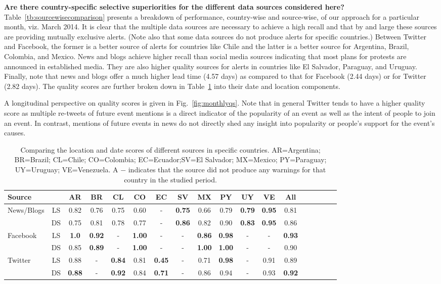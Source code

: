 \documentclass[letterpaper]{article}
\begin{document}
\noindent
{\bf Are there country-specific selective superiorities for the
different data sources considered here?}
Table~\ref{tb:sourcewisecomparison} presents a breakdown of performance,
country-wise and source-wise, of our approach for a particular month,
viz. March 2014.  It is clear that the multiple data sources are
necessary to achieve a high recall and that by and large these sources
are providing mutually exclusive alerts. (Note also that some data
sources do not produce alerts for specific countries.) Between Twitter
and Facebook, the former is a better source of alerts for countries like
Chile and the latter is a better source for Argentina, Brazil, Colombia,
and Mexico.  News and blogs achieve higher recall than social media
sources indicating that most plans for protests are announced in
established media. They are also higher quality sources for alerts in
countries like El Salvador, Paraguay, and Uruguay.  Finally, note that
news and blogs offer a much higher lead time (4.57 days) as compared to
that for Facebook (2.44 days) or for Twitter (2.82 days). The quality
scores are further broken down in Table~\ref{tb:modelwisecomparison}
into their date and location components.

A longitudinal perspective on quality scores is given in
Fig.~\ref{fig:monthlyqs}. Note that in general Twitter tends to have a
higher quality score as multiple re-tweets of future event mentions is a
direct indicator of the popularity of an event as well as the intent of
people to join an event.  In contrast, mentions of future events in news
do not directly shed any insight into popularity or people's support for
the event's causes.\\

\begin{table} %
  \small
\centering
\caption{\small Comparing the location and date scores of different sources in specific countries.
AR=Argentina; BR=Brazil; CL=Chile; CO=Colombia; EC=Ecuador;SV=El
Salvador; MX=Mexico; PY=Paraguay; UY=Uruguay; VE=Venezuela. A $-$
indicates that the source did not produce any warnings for that country
in the studied period.} \label{tb:modelwisecomparison}
\begin{tabular}{|l|*{17}{c|}}
\hline
Source& & AR & BR & CL & CO & EC & SV & MX & PY & UY & VE & All\\
\hline
\multirow{2}{*}{News/Blogs} &LS &0.82&0.76&0.75&0.60&-&{\bf0.75}&0.66&0.79&{\bf0.79}&{\bf0.95}&0.81\\
                            &DS&0.75&0.81&0.78&0.77&-&{\bf0.86}&0.82&0.90&{\bf0.83}&{\bf0.95}&0.86\\
\hline
\multirow{2}{*}{Facebook} &LS &{\bf1.0}&{\bf0.92}&-&{\bf1.00}&-&-&{\bf0.86}&{\bf0.98}&-&-&{\bf0.93}\\
                          &DS&0.85&{\bf0.89}&-&{\bf1.00}&-&-&{\bf1.00}&{\bf1.00}&-&-&0.90\\
\hline
\multirow{2}{*}{Twitter} &LS &0.88&-&{\bf0.84}&0.81&{\bf0.45}&-&0.71&{\bf0.98}&-&0.91&0.89\\
                         &DS&{\bf0.88}&-&{\bf0.92}&0.84&{\bf0.71}&-&0.86&0.94&-&0.93&{\bf0.92}\\
\hline
\end{tabular}
\end{table}
\end{document}
